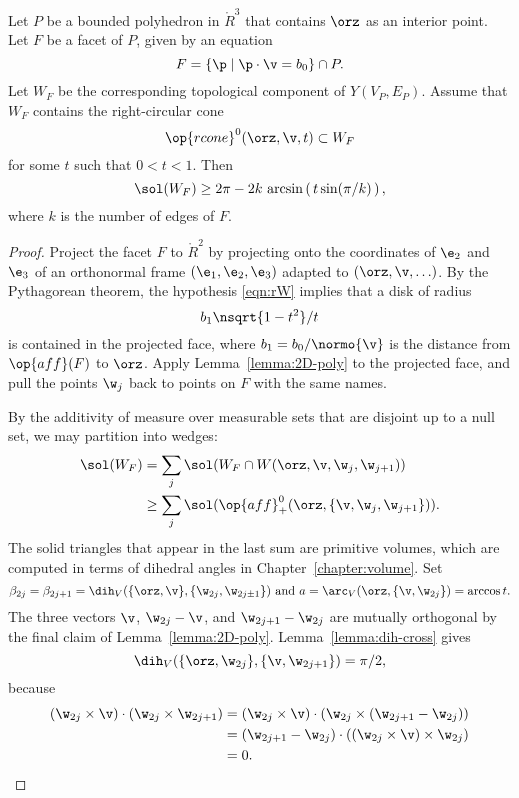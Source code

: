 \begin{lemma}[]\label{lemma:ngon} 
  Let $P$ be a bounded polyhedron in $\ring{R}^3$ that contains $\orz$
  as an interior point.  Let $F$ be a facet of $P$, given by an
  equation
\[  
F = \{\p \mid \p \cdot \v = b_0\} \cap P.
\]  
Let $W_F$ be the corresponding topological component of $Y(V_P,E_P)$.
Assume that $W_F$ contains the right-circular cone
\begin{equation}\label{eqn:rW}
\op{rcone}^0(\orz,\v,t) \subset W_F
\end{equation}
for some $t$ such that $0<t<1$.
Then 
\[  
\sol(W_F) \ge 
2\pi - 2 k \,\arcsin\left(\,t\sin(\pi/k)\,\right),
\] 
where $k$ is the number of edges of $F$.
\end{lemma}

\begin{proof}
  Project the facet $F$ to $\ring{R}^2$ by  projecting onto
  the coordinates of $\e_2$ and $\e_3$ of  an orthonormal frame
  $(\e_1,\e_2,\e_3)$ adapted to $(\orz,\v,\ldots)$.  By the Pythagorean theorem,
  the hypothesis \eqref{eqn:rW} implies that a disk of radius
\[
b_1 \nsqrt{1-t^2}/t 
\]
is contained in the projected face, where $b_1= b_0/\normo{\v}$ is the
distance from $\op{aff}(F)$ to $\orz$.  Apply
Lemma~\ref{lemma:2D-poly} to the projected face, and pull the points
$\w_j$ back to points on $F$ with the same names.

By the additivity of measure over measurable sets that are disjoint up
to a null set, we may partition into wedges:
\begin{align*}
\sol(W_F) &= \sum_j \sol(W_F \cap W(\orz,\v,\w_j,\w_{j+1}))\\
  &\ge \sum_j \sol(\op{aff}_+^0(\orz,\{\v,\w_j,\w_{j+1}\})).
\end{align*}
The solid triangles that appear in the last sum are primitive volumes,
which are computed in terms of
dihedral angles  in Chapter~\ref{chapter:volume}.  Set
\[
\beta_{2j}=\beta_{2j+1}=\dih_V(\{\orz,\v\},\{\w_{2j},\w_{2j\pm1}\}) \text{ and }
a = \arc_V(\orz,\{\v,\w_{2j}\}) = \arccos t.
\]
The three vectors $\v$, $\w_{2j}-\v$, and $\w_{2j+1}-\w_{2j}$ are
mutually orthogonal by the final claim of Lemma~\ref{lemma:2D-poly}.
Lemma~\ref{lemma:dih-cross} gives
\[
\dih_V(\{\orz,\w_{2j}\},\{\v,\w_{2j+1}\}) =\pi/2,
\]
because
\begin{align*}
(\w_{2j} \times \v)\cdot (\w_{2j}\times \w_{2j+1}) &=
(\w_{2j} \times \v)\cdot (\w_{2j}\times (\w_{2j+1}-\w_{2j}))\\
 &=  (\w_{2j+1}-\w_{2j})\cdot ((\w_{2j} \times \v)\times \w_{2j})\\
&= 0.
\end{align*}


\end{proof}
